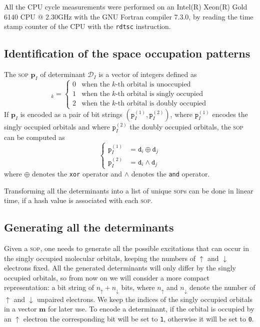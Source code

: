 \documentclass[aip,jcp,reprint,showkeys]{revtex4-1}
\newcommand{\md}{\mathtt{d}}
\newcommand{\mD}{\mathcal{D}}
\newcommand{\mpp}{\mathtt{p}}
\newcommand{\mpv}{\mathbf{p}}
\newcommand{\up}{\uparrow}
\newcommand{\dn}{\downarrow}
\newcommand{\one}{{\texttt{1}}}
\newcommand{\zero}{{\texttt{0}}}
\newcommand{\sop}{\textsc{sop}}
\begin{document}
All the CPU cycle measurements were performed  on an Intel(R) Xeon(R)
Gold 6140 CPU @ 2.30GHz with the GNU Fortran compiler 7.3.0, by reading
the time stamp counter of the CPU with the \texttt{rdtsc} instruction.


\subsection{Identification of the space occupation patterns}

The {\sop} $\mpv_I$ of determinant $\mD_I$ 
is a vector of integers defined as
\begin{equation}
  [\mpv_I]_k = 
  \begin{cases} 
    0 & \text{when the $k$-th orbital is unoccupied} \\
    1 & \text{when the $k$-th orbital is singly occupied} \\
    2 & \text{when the $k$-th orbital is doubly occupied}
  \end{cases} 
\end{equation}
If $\mpv_I$ is encoded as a pair of bit strings $(\mpp_I^{(1)}, \mpp_I^{(2)})$, where
$\mpp_I^{(1)}$ encodes the singly occupied orbitals and where $\mpp_I^{(2)}$ the doubly
occupied orbitals, the {\sop} can be computed as
\begin{equation}
\label{eq:sop}
\begin{cases}
  \mpp_I^{(1)} & = \md_i \oplus \md_j \\
  \mpp_I^{(2)} & = \md_i \wedge \md_j 
  \end{cases} 
\end{equation}
where $\oplus$ denotes the \texttt{xor} operator and $\wedge$ denotes the
\texttt{and} operator.

Transforming all the determinants into a list of unique \sop s can be done
in linear time, if a hash value is associated with each \sop .\cite{Bitton_1983}

\subsection{Generating all the determinants}


Given a {\sop}, one needs to generate all the possible excitations that can
occur in the singly occupied molecular orbitals, keeping the numbers of $\up$
and $\dn$ electrons fixed.
All the generated determinants will only differ by the singly occupied orbitals,
so from now on we will consider a more compact representation: a bit string of
$n_\up + n_\dn$ bits, where $n_\up$ and $n_\dn$ denote the number of $\up$ and
$\dn$ unpaired electrons. We keep the indices of the singly occupied orbitals
in a vector $\mathbf{m}$ for later use.
To encode a determinant, if the orbital is occupied by an $\up$ electron the
corresponding bit will be set to \one{}, otherwise it will be set to \zero{}.
\end{document}
